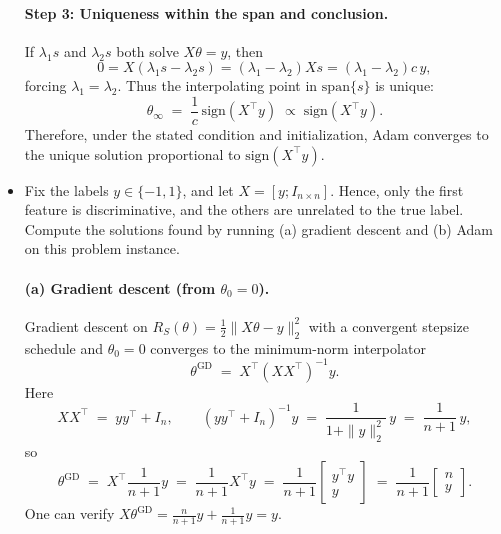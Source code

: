 \documentclass[a4paper]{article}
\begin{document}
\begin{itemize}
\paragraph{Step 3: Uniqueness within the span and conclusion.}
If $\lambda_1 s$ and $\lambda_2 s$ both solve $X\theta=y$, then
\[
0=X(\lambda_1 s-\lambda_2 s)=(\lambda_1-\lambda_2) X s
=(\lambda_1-\lambda_2) c\, y,
\]
forcing $\lambda_1=\lambda_2$. Thus the interpolating point in $\mathrm{span}\{s\}$ is unique:
\[
\theta_\infty \;=\; \frac{1}{c}\, \mathrm{sign}(X^\top y)\;\propto\; \mathrm{sign}(X^\top y).
\]
Therefore, under the stated condition and initialization, Adam converges to the unique solution proportional to $\mathrm{sign}(X^\top y)$.

    \item Fix the labels $y \in \{-1, 1\}$, and let $X = [y; I_{n\times n}]$. 
        Hence, only the first feature is discriminative, and the others are unrelated to the true label.
        Compute the solutions found by running (a) gradient descent and (b) Adam on this problem instance.

\paragraph{(a) Gradient descent (from $\theta_0=0$).}
Gradient descent on $R_S(\theta)=\tfrac12\|X\theta-y\|_2^2$ with a convergent stepsize schedule and $\theta_0=0$ converges to the minimum-norm interpolator
\[
\theta^{\text{GD}} \;=\; X^\top(XX^\top)^{-1}y.
\]
Here
\[
XX^\top \;=\; yy^\top + I_n,
\qquad
(yy^\top + I_n)^{-1}y \;=\; \frac{1}{1+\|y\|_2^2}\,y \;=\; \frac{1}{n+1}\,y,
\]
so
\[
\theta^{\text{GD}}
\;=\; X^\top \frac{1}{n+1}y
\;=\; \frac{1}{n+1} X^\top y
\;=\; \frac{1}{n+1}\begin{bmatrix} y^\top y \\[2pt] y \end{bmatrix}
\;=\; \frac{1}{n+1}\begin{bmatrix} n \\[2pt] y \end{bmatrix}.
\]
One can verify $X\theta^{\text{GD}}=\frac{n}{n+1}y+\frac{1}{n+1}y=y$.


\end{itemize}
\end{document}
